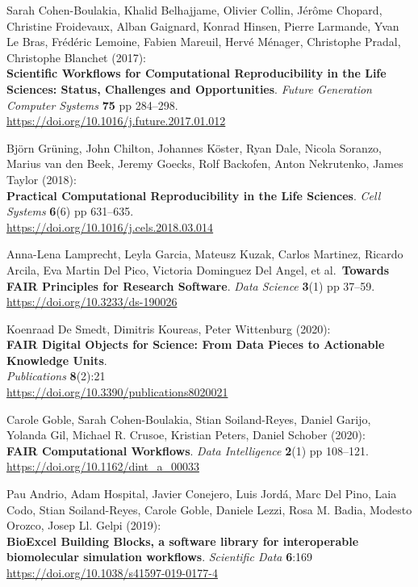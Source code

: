 \begin{thebibliography}{9}
 Sarah Cohen-Boulakia, Khalid Belhajjame, Olivier Collin, Jérôme
Chopard, Christine Froidevaux, Alban Gaignard, Konrad Hinsen, Pierre
Larmande, Yvan Le Bras, Frédéric Lemoine, Fabien Mareuil, Hervé Ménager,
Christophe Pradal, Christophe Blanchet (2017):\\
\textbf{Scientific Workflows for Computational Reproducibility in the
Life Sciences: Status, Challenges and Opportunities}. \emph{Future
Generation Computer Systems} \textbf{75} pp 284--298.\\
\url{https://doi.org/10.1016/j.future.2017.01.012}

 Björn Grüning, John Chilton, Johannes Köster, Ryan Dale, Nicola
Soranzo, Marius van den Beek, Jeremy Goecks, Rolf Backofen, Anton
Nekrutenko, James Taylor (2018):\\
\textbf{Practical Computational Reproducibility in the Life Sciences}.
\emph{Cell Systems} \textbf{6}(6) pp 631--635.\\
\url{https://doi.org/10.1016/j.cels.2018.03.014}

 Anna-Lena Lamprecht, Leyla Garcia, Mateusz Kuzak, Carlos
Martinez, Ricardo Arcila, Eva Martin Del Pico, Victoria Dominguez Del
Angel, et al.~\textbf{Towards FAIR Principles for Research Software}.
\emph{Data Science} \textbf{3}(1) pp 37--59.\\
\url{https://doi.org/10.3233/ds-190026}

 Koenraad De Smedt, Dimitris Koureas, Peter Wittenburg (2020):\\
\textbf{FAIR Digital Objects for Science: From Data Pieces to Actionable
Knowledge Units}.\\
\emph{Publications} \textbf{8}(2):21\\
\url{https://doi.org/10.3390/publications8020021}

 Carole Goble, Sarah Cohen-Boulakia, Stian Soiland-Reyes, Daniel
Garijo, Yolanda Gil, Michael R. Crusoe, Kristian Peters, Daniel Schober
(2020):\\
\textbf{FAIR Computational Workflows}. \emph{Data Intelligence}
\textbf{2}(1) pp 108--121.\\
\url{https://doi.org/10.1162/dint_a_00033}

 Pau Andrio, Adam Hospital, Javier Conejero, Luis Jordá, Marc
Del Pino, Laia Codo, Stian Soiland-Reyes, Carole Goble, Daniele Lezzi,
Rosa M. Badia, Modesto Orozco, Josep Ll. Gelpi (2019):\\
\textbf{BioExcel Building Blocks, a software library for interoperable
biomolecular simulation workflows}. \emph{Scientific Data}
\textbf{6}:169\\
\url{https://doi.org/10.1038/s41597-019-0177-4}


\end{thebibliography}
